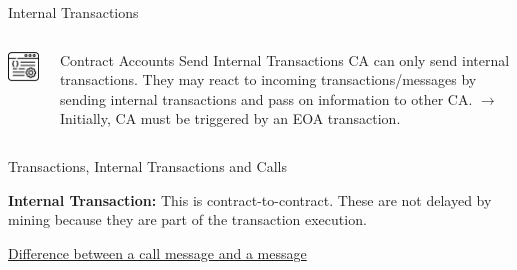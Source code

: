 \documentclass[handout]{beamer}
\begin{document}
\begin{frame}{Internal Transactions}

\begin{columns}[T]
	\begin{column}{0.35\textwidth}
		\includegraphics[width=3cm]{../assets/images/CA}
	\end{column} %
		
	\begin{column}{0.65\textwidth}
		\begin{keytakeaway}{Contract Accounts Send Internal Transactions}
			CA can only send internal transactions. They may react to incoming transactions/messages by sending internal transactions and pass on information to other CA. $\rightarrow$ Initially, CA must be triggered by an EOA transaction.
		\end{keytakeaway}
	\end{column}
	
\end{columns}
\vspace{1em}



\end{frame}

\begin{frame}{Transactions, Internal Transactions and Calls}

\textbf{Internal Transaction:} This is contract-to-contract. These are not delayed by mining because they are part of the transaction execution.
\vspace{1em}

\vspace{1em}


\link \href{https://ethereum.stackexchange.com/questions/12065/what-is-the-difference-between-a-call-message-call-and-a-message}{Difference between a call message and a message}
\vspace{1em}


\end{frame}
\end{document}
